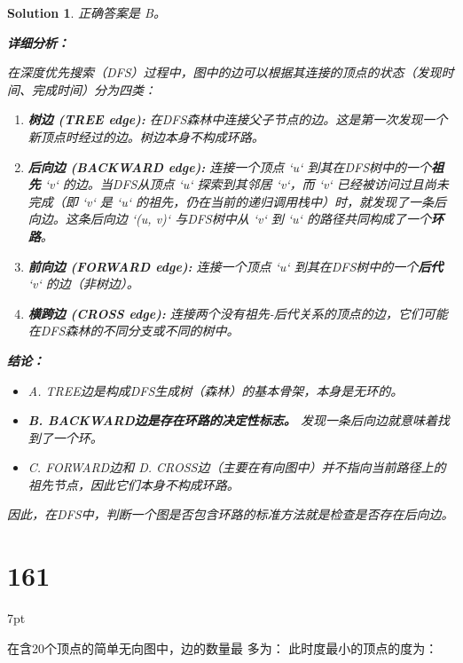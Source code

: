 \documentclass[UTF8]{report}
\newtheorem{solution}{Solution}
\theoremstyle{MyLineTheoremStyle} %
\theoremstyle{MyBlockTheoremStyle} %
\theoremstyle{MySubsubsectionStyle} %
\newenvironment{graybox}{%
        \def\FrameCommand{%
        \hspace{1pt}%
        {\color{gray}\small \vrule width 2pt}%
        {\color{graybox_color}\vrule width 4pt}%
        \colorbox{graybox_color}%
        }%
        \MakeFramed{\advance\hsize-\width\FrameRestore}%
        \noindent\hspace{-4.55pt}%
        \begin{adjustwidth}{}{7pt}%
        \vspace{2pt}\vspace{2pt}%
        }
        {%
        \vspace{2pt}\end{adjustwidth}\endMakeFramed%
        }
\begin{document}
\begin{solution}
正确答案是 B。

\textbf{详细分析：}

在深度优先搜索（DFS）过程中，图中的边可以根据其连接的顶点的状态（发现时间、完成时间）分为四类：

\begin{enumerate}
    \item \textbf{树边 (TREE edge):} 在DFS森林中连接父子节点的边。这是第一次发现一个新顶点时经过的边。树边本身不构成环路。

    \item \textbf{后向边 (BACKWARD edge):} 连接一个顶点 `u` 到其在DFS树中的一个\textbf{祖先} `v` 的边。当DFS从顶点 `u` 探索到其邻居 `v`，而 `v` 已经被访问过且尚未完成（即 `v` 是 `u` 的祖先，仍在当前的递归调用栈中）时，就发现了一条后向边。这条后向边 `(u, v)` 与DFS树中从 `v` 到 `u` 的路径共同构成了一个\textbf{环路}。

    \item \textbf{前向边 (FORWARD edge):} 连接一个顶点 `u` 到其在DFS树中的一个\textbf{后代} `v` 的边（非树边）。

    \item \textbf{横跨边 (CROSS edge):} 连接两个没有祖先-后代关系的顶点的边，它们可能在DFS森林的不同分支或不同的树中。
\end{enumerate}

\textbf{结论：}
\begin{itemize}
    \item A. TREE边是构成DFS生成树（森林）的基本骨架，本身是无环的。
    \item \textbf{B. BACKWARD边是存在环路的决定性标志。} 发现一条后向边就意味着找到了一个环。
    \item C. FORWARD边和 D. CROSS边（主要在有向图中）并不指向当前路径上的祖先节点，因此它们本身不构成环路。
\end{itemize}

因此，在DFS中，判断一个图是否包含环路的标准方法就是检查是否存在后向边。
\end{solution}


\section*{161}
\begin{graybox}
在含20个顶点的简单无向图中，边的数量最
多为：\underline{\hspace{2cm}}
此时度最小的顶点的度为：\underline{\hspace{2cm}}
\end{graybox}
\end{document}
